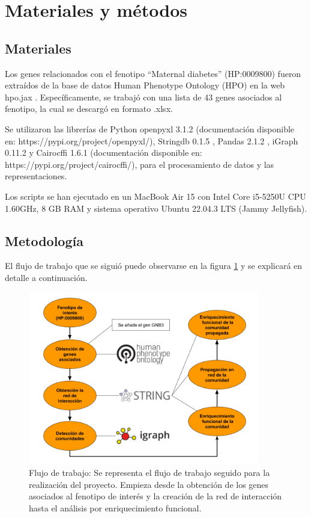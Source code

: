 \section{Materiales y métodos}

\subsection{Materiales}
Los genes relacionados con el fenotipo ``Maternal diabetes'' (HP:0009800) fueron extraídos de la base de datos Human Phenotype Ontology (HPO) en la web hpo.jax \cite{Kohler2017}. Específicamente, se trabajó con una lista de 43 genes asociados al fenotipo, la cual se descargó en formato .xlsx.

Se utilizaron las librerías de Python
openpyxl 3.1.2 (documentación disponible en: https://pypi.org/project/openpyxl/), Stringdb 0.1.5 \cite{Mering2005}, Pandas 2.1.2 \cite{McKinney2015}, iGraph 0.11.2 \cite{Csardi2006} y Cairocffi 1.6.1 (documentación disponible en: https://pypi.org/project/cairocffi/), para el procesamiento de datos y las representaciones.

Los scripts se han ejecutado en un MacBook Air 15 con Intel Core i5-5250U CPU 1.60GHz, 8 GB RAM y sistema operativo Ubuntu 22.04.3 LTS (Jammy Jellyfish).

\subsection{Metodología}

El flujo de trabajo que se siguió puede observarse en la figura \ref{fig:workflow} y se explicará en detalle a continuación.

\begin{figure}[h!]
	\includegraphics[width=0.9\textwidth]{figures/workflow.png}
	\caption{Flujo de trabajo: Se representa el flujo de trabajo seguido para la realización del proyecto. Empieza desde la obtención de los genes asociados al fenotipo de interés y la creación de la red de interacción hasta el análisis por enriquecimiento funcional.}
	\label{fig:workflow}
\end{figure}

